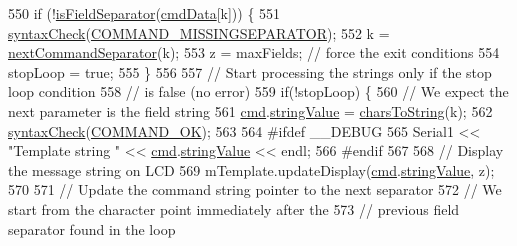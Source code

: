 \begin{DoxyCode}
\begin{DoxyCode}
\begin{DoxyCode}
\begin{DoxyCode}
550               \textcolor{keywordflow}{if} (!\hyperlink{_meditech___chip_kit_control_panel_8pde_a5e204e0bba8ab8ee2bde88215bf2ee53}{isFieldSeparator}(\hyperlink{_meditech___chip_kit_control_panel_8pde_afd31a444e0380e6be247c64cdb1510a9}{cmdData}[k])) \{
551                 \hyperlink{_meditech___chip_kit_control_panel_8pde_a586164a6eff90eab6ba87a6ca123770d}{syntaxCheck}(\hyperlink{_parser_errors_8h_af1641bf12003024ece5012a639004d5c}{COMMAND\_MISSINGSEPARATOR});
552                 k = \hyperlink{_meditech___chip_kit_control_panel_8pde_a4b62bbf3dd6cf7eb7fee557932fd1b7c}{nextCommandSeparator}(k);
553                 z = maxFields; \textcolor{comment}{// force the exit conditions}
554                 stopLoop = \textcolor{keyword}{true};
555               \}
556               
557               \textcolor{comment}{// Start processing the strings only if the stop loop condition}
558               \textcolor{comment}{// is false (no error)}
559               \textcolor{keywordflow}{if}(!stopLoop) \{
560                 \textcolor{comment}{// We expect the next parameter is the field string}
561                 \hyperlink{_meditech___chip_kit_control_panel_8pde_a9ec7ba7a86dba057afdae246ca1ac40e}{cmd}.\hyperlink{structparse_command_ac5ece0b161e3fae794d08911247c0b1e}{stringValue} = \hyperlink{_meditech___chip_kit_control_panel_8pde_af256eb98be4447dd754239d6c5cf4792}{charsToString}(k);
562                 \hyperlink{_meditech___chip_kit_control_panel_8pde_a586164a6eff90eab6ba87a6ca123770d}{syntaxCheck}(\hyperlink{_parser_errors_8h_a2c83bbbe0909f24f241850845b38aa9f}{COMMAND\_OK});
563                 
564 \textcolor{preprocessor}{                #ifdef \_\_DEBUG}
565 \textcolor{preprocessor}{}                Serial1 << \textcolor{stringliteral}{"Template string "} << \hyperlink{_meditech___chip_kit_control_panel_8pde_a9ec7ba7a86dba057afdae246ca1ac40e}{cmd}.\hyperlink{structparse_command_ac5ece0b161e3fae794d08911247c0b1e}{stringValue} << endl;
566 \textcolor{preprocessor}{                #endif}
567 \textcolor{preprocessor}{}  
568                 \textcolor{comment}{// Display the message string on LCD}
569                 mTemplate.updateDisplay(\hyperlink{_meditech___chip_kit_control_panel_8pde_a9ec7ba7a86dba057afdae246ca1ac40e}{cmd}.\hyperlink{structparse_command_ac5ece0b161e3fae794d08911247c0b1e}{stringValue}, z);
570                 
571                 \textcolor{comment}{// Update the command string pointer to the next separator}
572                 \textcolor{comment}{// We start from the character point immediately after the }
573                 \textcolor{comment}{// previous field separator found in the loop}

\end{DoxyCode}
\end{DoxyCode}
\end{DoxyCode}
\end{DoxyCode}
